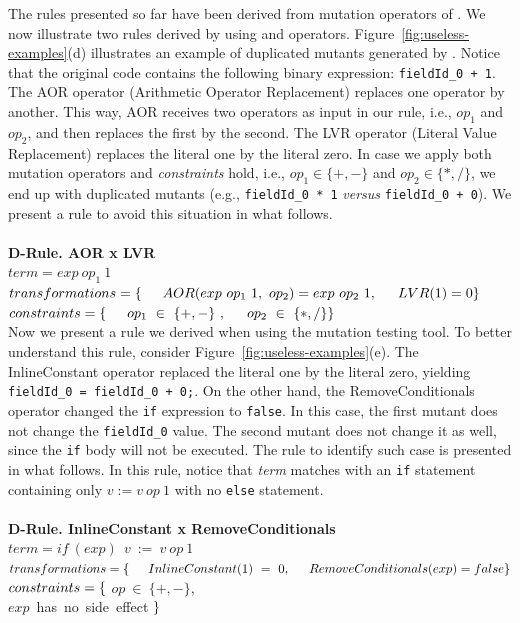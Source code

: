 The rules presented so far have been derived from mutation operators of \mujava{}. We now illustrate two rules derived by using \major{} and \pit{} operators. Figure~\ref{fig:useless-examples}(d) illustrates an example of duplicated mutants generated by \major{}. Notice that the original code contains the following binary expression: \texttt{fieldId\_0 + 1}. The AOR operator (Arithmetic Operator Replacement) replaces one operator by another. This way, AOR receives two operators as input in our rule, i.e., $op_1$ and $op_2$, and then replaces the first by the second. The LVR operator (Literal Value Replacement) replaces the literal one by the literal zero. In case we apply both mutation operators and \textit{constraints} hold, i.e., $op_1 \in \{+,-\}$ and $op_2 \in \{*,/\}$, we end up with duplicated mutants (e.g., \texttt{fieldId\_0 * 1} \textit{versus} \texttt{fieldId\_0 + 0}). We present a rule to avoid this situation in what follows.
\\
\\
\textbf{D-Rule. AOR x LVR}\\
$term =  exp~op_1~1 $\\
$transformations = \{ \\ \indent AOR(exp~op_1~1,~op_2) = exp~op_2~1, \\
\indent LVR(1)=0 \\ \}$\\
$constraints = \{\\ \indent op_1~\in~\{+, -\}~, \\ \indent op_2~\in~\{*, /\} \\ \}$\\

Now we present a rule we derived when using the \pit{} mutation testing tool. To better understand this rule, consider Figure~\ref{fig:useless-examples}(e). The InlineConstant operator replaced the literal one by the literal zero, yielding \texttt{fieldId\_0 = fieldId\_0 + 0;}. On the other hand, the RemoveConditionals operator changed the \texttt{if} expression to \texttt{false}. In this case, the first mutant does not change the \texttt{fieldId\_0} value. The second mutant does not change it as well, since the \texttt{if} body will not be executed. The rule to identify such case is presented in what follows. In this rule, notice that \textit{term} matches with an \texttt{if} statement containing only $v := v~op~1$ with no \texttt{else} statement.
\\
\\
\textbf{D-Rule. InlineConstant x RemoveConditionals}\\
$term = if~(exp)~{~v~:=~v~op~1} $\\
$transformations = \{ \\ \indent InlineConstant(1)~=~0,\\ \indent RemoveConditionals(exp)=false \\ \}$\\
$constraints = \{ \\$ \indent $op~\in~\{+, -\}$, \\ \indent $exp$~has~no~side~effect $ \\ \}$

